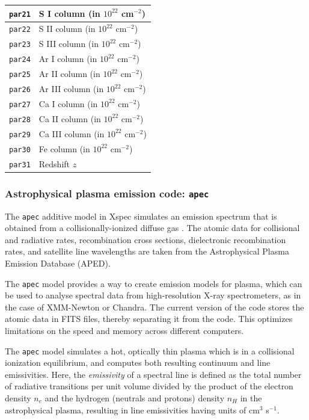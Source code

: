 \begin{table}[h!]
\begin{tabular}{|p{3cm}|p{10cm}|}
					{\texttt{par21}} & {S I column (in $10^{22}$ cm$^{-2}$)} \\ \hline
					{\texttt{par22}} & {S II column (in $10^{22}$ cm$^{-2}$)} \\ \hline
					{\texttt{par23}} & {S III column (in $10^{22}$ cm$^{-2}$)} \\ \hline
					{\texttt{par24}} & {Ar I column (in $10^{22}$ cm$^{-2}$)} \\ \hline
					{\texttt{par25}} & {Ar II column (in $10^{22}$ cm$^{-2}$)} \\ \hline
					{\texttt{par26}} & {Ar III column (in $10^{22}$ cm$^{-2}$)} \\ \hline
					{\texttt{par27}} & {Ca I column (in $10^{22}$ cm$^{-2}$)} \\ \hline
					{\texttt{par28}} & {Ca II column (in $10^{22}$ cm$^{-2}$)} \\ \hline
					{\texttt{par29}} & {Ca III column (in $10^{22}$ cm$^{-2}$)} \\ \hline
					{\texttt{par30}} & {Fe column (in $10^{22}$ cm$^{-2}$)} \\ \hline
					{\texttt{par31}} & {Redshift $z$} \\ \hline
				\end{tabular}
			\end{table}
			
			\subsubsection{Astrophysical plasma emission code: \texttt{apec}}
				The \texttt{apec} additive model in Xspec simulates an emission spectrum that is obtained from a collisionally-ionized diffuse gas \cite{smithAPEC}. The atomic data for collisional and radiative rates, recombination cross sections, dielectronic recombination rates, and satellite line wavelengths are taken from the Astrophysical Plasma Emission Database (APED).
			
				The \texttt{apec} model provides a way to create emission models for plasma, which can be used to analyse spectral data from high-resolution X-ray spectrometers, as in the case of XMM-Newton or Chandra. The current version of the code stores the atomic data in FITS files, thereby separating it from the code. This optimizes limitations on the speed and memory across different computers.
			
				The \texttt{apec} model simulates a hot, optically thin plasma which is in a collisional ionization equilibrium, and computes both resulting continuum and line emissivities. Here, the \textit{emissivity} of a spectral line is defined as the  total number of radiative transitions per unit volume divided by the product of the electron density $n_e$ and the hydrogen (neutrals and protons) density $n_H$ in the astrophysical plasma, resulting in line emissivities having units of cm$^3$ s$^{-1}$.
			
